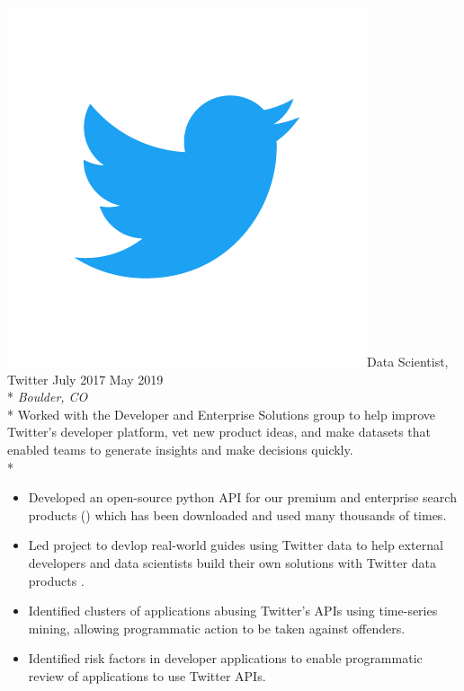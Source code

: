 \documentclass[print]{friggeri-cv} %
\newcommand{\twittericon}{\includegraphics[scale=0.05]{Twitter_Logo_Blue.png}}%
\begin{document}
\begin{description} \itemsep1pt \parskip0pt 
  \item \twittericon {\largeheaderfont Data Scientist, Twitter } \hfill
    {\smallheaderfont July 2017 \textemdash  May 2019}\\*
    {\footnotesize \emph{Boulder, CO}} \\*
    Worked with the Developer and Enterprise Solutions group to help improve
    Twitter's developer platform, vet new product ideas, and make datasets that
    enabled teams to generate insights and make decisions quickly.\\*
    
    \begin{itemize} \itemsep1pt \parskip1pt 
      \item Developed an open-source python API for our premium and enterprise search
          products (\cite{search_tweets_python}) which has been downloaded and used 
          many thousands of times.

      \item Led project to devlop real-world guides using Twitter data to
      help external developers and data scientists build their own solutions
      with Twitter data products \cite{do_more_with_twtter_data}.

      \item Identified clusters of applications abusing Twitter's APIs using time-series mining, allowing
      programmatic action to be taken against offenders.

      \item Identified risk factors in developer applications to enable programmatic
            review of applications to use Twitter APIs.

    \end{itemize}
\end{description}
\end{document}
